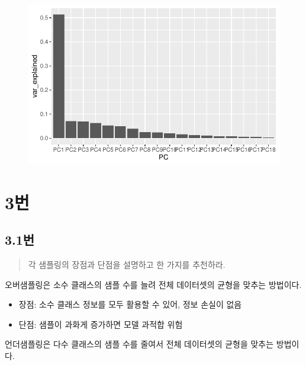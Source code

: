 \documentclass[
  letterpaper,
  DIV=11,
  numbers=noendperiod]{scrreprt}
\providecommand{\tightlist}{%
  \setlength{\itemsep}{0pt}\setlength{\parskip}{0pt}}\usepackage{longtable,booktabs,array}
\begin{document}
\begin{figure}[H]

{\centering \includegraphics{./test_27_files/figure-pdf/unnamed-chunk-6-1.pdf}

}

\end{figure}

\hypertarget{uxbc88-5}{%
\chapter*{3번}\label{uxbc88-5}}


\hypertarget{uxbc88-6}{%
\section*{3.1번}\label{uxbc88-6}}


\begin{quote}
각 샘플링의 장점과 단점을 설명하고 한 가지를 추천하라.
\end{quote}

오버샘플링은 소수 클래스의 샘플 수를 늘려 전체 데이터셋의 균형을 맞추는
방법이다.

\begin{itemize}
\tightlist
\item
  장점: 소수 클래스 정보를 모두 활용할 수 있어, 정보 손실이 없음
\item
  단점: 샘플이 과화게 증가하면 모델 과적합 위험
\end{itemize}

언더샘플링은 다수 클래스의 샘플 수를 줄여서 전체 데이터셋의 균형을
맞추는 방법이다.
\end{document}
